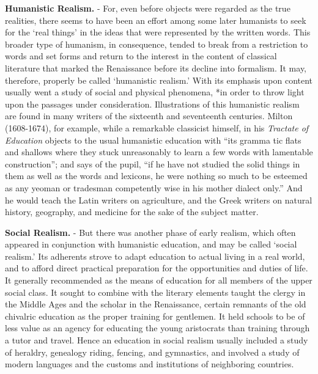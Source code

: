\documentclass[]{book}
\begin{document}
\textbf{Humanistic Realism.} - For, even before objects were regarded as the true realities, there seems to have been an effort among some later humanists to seek for the `real things' in the ideas that were represented by the written words. This broader type of humanism, in consequence, tended to break from a restriction to words and set forms and return to the interest in the content of classical literature that marked the Renaissance before its decline into formalism. It may, therefore, properly be called `humanistic realism.' With its emphasis upon content usually went a study of social and physical phenomena, *in order to throw light upon the passages under consideration. Illustrations of this humanistic realism are found in many writers of the sixteenth and seventeenth centuries. Milton (1608-1674), for example, while a remarkable classicist himself, in his \emph{Tractate of Education} objects to the usual humanistic education with ``its gramma tic flats and shallows where they stuck unreasonably to learn a few words with lamentable construction''; and says of the pupil, ``if he have not studied the solid things in them as well as the words and lexicons, he were nothing so much to be esteemed as any yeoman or tradesman competently wise in his mother dialect only.'' And he would teach the Latin writers on agriculture, and the Greek writers on natural history, geography, and medicine for the sake of the subject matter.

\textbf{Social Realism.} - But there was another phase of early realism, which often appeared in conjunction with humanistic education, and may be called `social realism.' Its adherents strove to adapt education to actual living in a real world, and to afford direct practical preparation for the opportunities and duties of life. It generally recommended as the means of education for all members of the upper social class. It sought to combine with the literary elements taught the clergy in the Middle Ages and the scholar in the Renaissance, certain remnants of the old chivalric education as the proper training for gentlemen. It held schools to be of less value as an agency for educating the young aristocrats than training through a tutor and travel. Hence an education in social realism usually included a study of heraldry, genealogy riding, fencing, and gymnastics, and involved a study of modern languages and the customs and institutions of neighboring countries.
\end{document}
